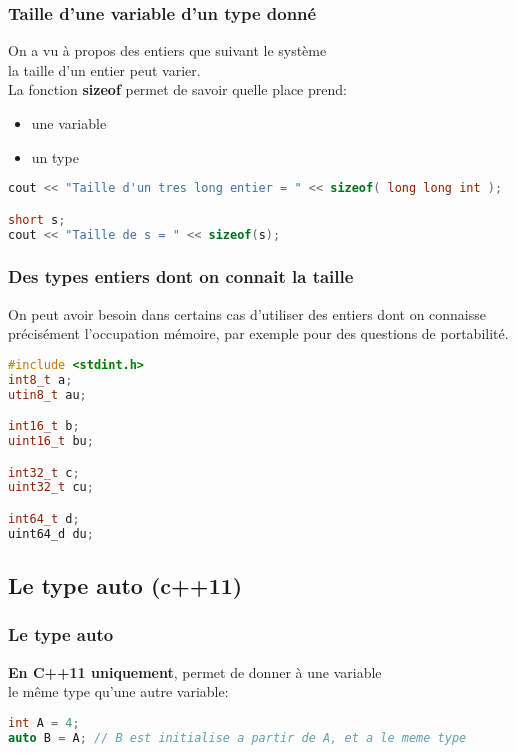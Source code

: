 \documentclass{beamer}
\begin{document}
\begin{frame}[fragile=singleslide,shrink=20]
\frametitle {Taille d'une variable d'un type donné}
On a vu à propos des entiers que suivant le système \\ la taille d'un entier peut varier. \\
La fonction \textbf{sizeof} permet de savoir quelle place prend:
\begin{itemize}
\item{une variable}
\item{un type}
\end{itemize}

\begin{lstlisting}[language=c++]
cout << "Taille d'un tres long entier = " << sizeof( long long int );

short s;
cout << "Taille de s = " << sizeof(s);
\end{lstlisting}
\end{frame}

\begin{frame}[fragile=singleslide,shrink=20]
\frametitle {Des types entiers dont on connait la taille}
On peut avoir besoin dans certains cas d'utiliser des entiers dont on connaisse \\
précisément l'occupation mémoire, par exemple pour des questions de portabilité.
\begin{lstlisting}[language=c++]
#include <stdint.h>
int8_t a;
utin8_t au;

int16_t b;
uint16_t bu;

int32_t c;
uint32_t cu;

int64_t d;
uint64_d du;
\end{lstlisting}
\end{frame}

\subsection{Le type auto (c++11)}

\begin{frame}[fragile=singleslide,shrink=20]
\frametitle{Le type auto}
\textbf{En C++11 uniquement}, permet de donner à une variable \\ 
le même type qu'une autre variable:
\begin{lstlisting}[language=c++]
int A = 4;
auto B = A; // B est initialise a partir de A, et a le meme type
\end{lstlisting}
\end{frame}
\end{document}
